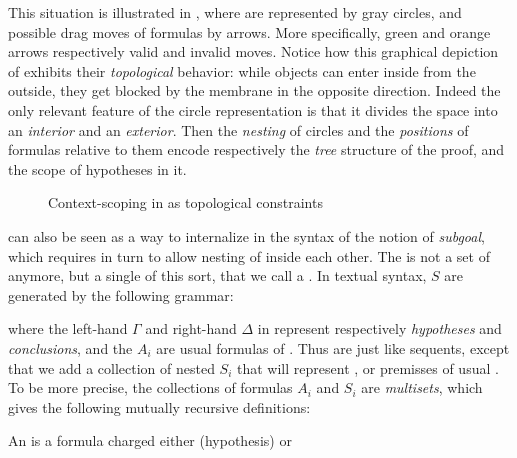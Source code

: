 \begin{scope}
This situation is illustrated in , where  are
represented by gray circles, and possible drag moves of formulas by arrows. More
specifically, green and orange arrows  respectively valid and invalid
moves. Notice how this graphical depiction of  exhibits their
\emph{topological} behavior: while objects can enter inside  from the
outside, they get blocked by the membrane in the opposite direction. Indeed the
only relevant feature of the circle representation is that it divides the space
into an \emph{interior} and an \emph{exterior}. Then the \emph{nesting} of
circles and the \emph{positions} of formulas relative to them encode
respectively the \emph{tree} structure of the proof, and the scope of hypotheses
in it.

\begin{figure}
\caption{Context-scoping in  as topological constraints}
\end{figure}
 can also be seen as a way to internalize in the syntax of
 the notion of \emph{subgoal}, which requires in turn to allow
nesting of  inside each other. The  is not a set of
 anymore, but a single  of this sort, that we
call a \emph{}. In textual
syntax,  $S$ are generated by the following grammar:
where the left-hand $\Gamma$ and right-hand $\Delta$ in  represent
respectively \emph{hypotheses} and \emph{conclusions}, and the $A_i$ are usual
formulas of . Thus  are just like sequents, except that we add
a collection of nested  $S_i$ that will represent , or
premisses of usual . To be more precise, the collections of
formulas $A_i$ and  $S_i$ are \emph{multisets}, which gives the
following mutually recursive definitions:
\begin{definition}[Ion]
An  is a formula charged either  (hypothesis) or

\end{definition}
\end{scope}
